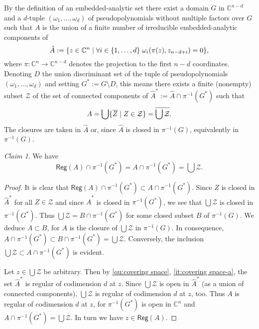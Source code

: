 \documentclass[a4paper]{amsart}
\newcommand{\C}{\mathbb{C}}
\newcommand{\Reg}[1]{\mathsf{Reg}(#1)}
\theoremstyle{remark}
\newtheorem{claim}{Claim}[question]
\numberwithin{equation}{question}
\DeclarePairedDelimiter\set{\{}{\}}
\begin{document}
\begin{solution}%
\begin{solenum}
\item By the definition of an embedded-analytic set there exist a domain $G$ in $\C^{n-d}$ and a $d$-tuple $(\omega_1,\dots,\omega_d)$ of pseudopolynomials without multiple factors over $G$ such that $A$ is the union of a finite number of irreducible embedded-analytic components of
\[
\hat A := \set{z \in \C^n \mid \forall i \in \set{1,\dots,d} \; \omega_i(\pi(z),z_{n-d+i}) = 0},
\]
where $\pi \colon \C^n \to \C^{n-d}$ denotes the projection to the first $n-d$ coordinates. Denoting $D$ the union discriminant set of the tuple of pseudopolynomials $(\omega_1,\dots,\omega_d)$ and setting $G^* := G \setminus D$, this means there exists a finite (nonempty) subset $\mathcal Z$ of the set of connected components of $\hat A^* := \hat A \cap \pi^{-1}(G^*)$ such that
\[
A = \bigcup \set{\overline Z \mid Z \in \mathcal Z} = \overline{\bigcup\mathcal Z} .
\]
The closures are taken in $\hat A$ or, since $\hat A$ is closed in $\pi^{-1}(G)$, equivalently in $\pi^{-1}(G)$.

\begin{claim}
\label{cl:irreducibility-1}
We have
\[
\Reg A \cap \pi^{-1}(G^*) = A \cap \pi^{-1}(G^*) = \bigcup\mathcal Z.
\]
\end{claim}
\begin{proof}
It is clear that $\Reg A \cap \pi^{-1}(G^*) \subset A \cap \pi^{-1}(G^*)$. Since $Z$ is closed in $\hat A^*$ for all $Z \in \mathcal Z$ and since $\hat A^*$ is closed in $\pi^{-1}(G^*)$, we see that $\bigcup\mathcal Z$ is closed in $\pi^{-1}(G^*)$. Thus $\bigcup\mathcal Z = B \cap \pi^{-1}(G^*)$ for some closed subset $B$ of $\pi^{-1}(G)$. We deduce $A \subset B$, for $A$ is the closure of $\bigcup\mathcal Z$ in $\pi^{-1}(G)$. In consequence, $A \cap \pi^{-1}(G^*) \subset B \cap \pi^{-1}(G^*) = \bigcup\mathcal Z$. Conversely, the inclusion $\bigcup\mathcal Z \subset A \cap \pi^{-1}(G^*)$ is evident.

Let $z \in \bigcup\mathcal Z$ be arbitrary. Then by \cref{qu:covering space}, \cref{it:covering space-a}, the set $\hat A^*$ is regular of codimension $d$ at $z$. Since $\bigcup\mathcal Z$ is open in $\hat A^*$ (as a union of connected components), $\bigcup\mathcal Z$ is regular of codimension $d$ at $z$, too. Thus $A$ is regular of codimension $d$ at $z$, for $\pi^{-1}(G^*)$ is open in $\C^n$ and $A \cap \pi^{-1}(G^*) = \bigcup\mathcal Z$. In turn we have $z \in \Reg A$.
\end{proof}


\end{solenum}
\end{solution}
\end{document}

